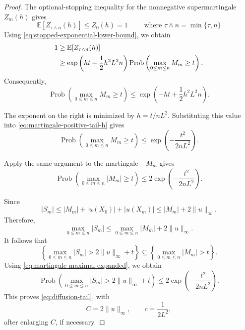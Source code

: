 \documentclass[11pt,a4paper]{amsart}
\theoremstyle{definition}
\theoremstyle{remark}
\numberwithin{equation}{section}
\newcommand{\EE}{\mathbb E}
\newcommand{\Prob}{\operatorname{Prob}}
\newcommand{\1}{\boldsymbol 1}
\begin{document}
\begin{proof}
The optional-stopping inequality for the nonnegative supermartingale
$Z_m(h)$ gives
$$
 \EE[Z_{\tau\wedge n}(h)]\le Z_0(h)=1 \qquad \text{ where } \tau \wedge n = \min\{\tau, n\}
$$
Using \eqref{eq:stopped-exponential-lower-bound}, we obtain
\begin{align}
 1
 &\ge
 \EE[Z_{\tau\wedge n}(h)]
 \notag\\
 &\ge
 \exp\left(
   ht-\frac12h^2L^2n
 \right)
 \Prob\left(
   \max_{0\le m\le n}M_m\ge t
 \right).
\end{align}
Consequently,
\begin{equation}\label{eq:martingale-positive-tail-h}
 \Prob\left(
   \max_{0\le m\le n}M_m\ge t
 \right)
 \le
 \exp\left(
   -ht+\frac12h^2L^2n
 \right).
\end{equation}

The exponent on the right is minimized by $h=t/nL^2$.
Substituting this value into
\eqref{eq:martingale-positive-tail-h} gives
\begin{equation}\label{eq:martingale-positive-tail}
 \Prob\left(
   \max_{0\le m\le n}M_m\ge t
 \right)
 \le
 \exp\left(
   -\frac{t^2}{2nL^2}
 \right).
\end{equation}

Apply the same argument to the martingale $-M_m$ gives 
\begin{equation}\label{eq:martingale-maximal-expanded}
 \Prob\left(
   \max_{0\le m\le n}|M_m|\ge t
 \right)
 \le
 2\exp\left(
   -\frac{t^2}{2nL^2}
 \right).
\end{equation}

Since
$$
 |S_m|
 \le
 |M_m|+|u(X_0)|+|u(X_m)|
 \le
 |M_m|+2\|u\|_\infty.
$$
Therefore,
\begin{equation}\label{eq:max-S-by-max-M}
 \max_{0\le m\le n}|S_m|
 \le
 \max_{0\le m\le n}|M_m|
 +2\|u\|_\infty.
\end{equation}
It follows that
$$
 \left\{
   \max_{0\le m\le n}|S_m|
   >
   2\|u\|_\infty+t
 \right\}
 \subseteq
 \left\{
   \max_{0\le m\le n}|M_m|>t
 \right\}.
$$
Using \eqref{eq:martingale-maximal-expanded}, we obtain
\begin{equation}\label{eq:S-maximal-tail-explicit}
 \Prob\left(
   \max_{0\le m\le n}|S_m|
   >
   2\|u\|_\infty+t
 \right)
 \le
 2\exp\left(
   -\frac{t^2}{2nL^2}
 \right).
\end{equation}
This proves \eqref{eq:diffusion-tail}, with
$$
 C=2\|u\|_\infty,
 \qquad
 c=\frac1{2L^2},
$$
after enlarging $C$, if necessary.


\end{proof}
\end{document}
